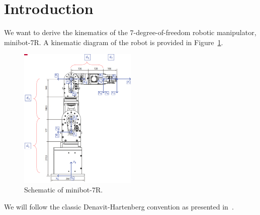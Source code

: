 \section{Introduction}
\label{sec:intro}

We want to derive the kinematics of the $7$-degree-of-freedom robotic 
manipulator, minibot-7R. A kinematic diagram of the robot is provided 
in Figure~\ref{fig:minibot}.

\begin{figure}[h]
  \centering
  \includegraphics[width=0.5\textwidth]{./figures/minibot-7R.eps}
  \caption{Schematic of minibot-7R.}
  \label{fig:minibot}
\end{figure}

We will follow the classic Denavit-Hartenberg convention as presented 
in~\cite{spong2020robot}.
